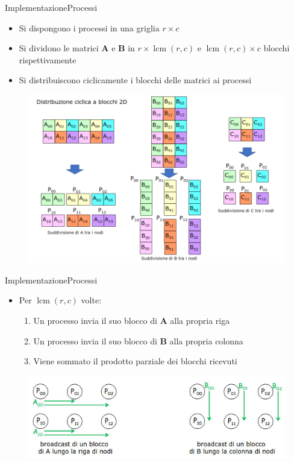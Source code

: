 \documentclass{beamer}
\DeclareMathOperator{\lcm}{lcm}
\begin{document}
\begin{frame}{Implementazione}{Processi}
    \begin{itemize}
        \item Si dispongono i processi in una griglia $r \times c$
        \item Si dividono le matrici $\mathbf{A}$ e $\mathbf{B}$ in $r \times \lcm(r,c)$ e $\lcm(r,c) \times c$ blocchi rispettivamente
        \item Si distribuiscono ciclicamente i blocchi delle matrici ai processi
    \end{itemize}
    \begin{figure}
        \includegraphics[width=0.55\linewidth]{imgs/summa.png}
    \end{figure}
\end{frame}

\begin{frame}{Implementazione}{Processi}
    \begin{itemize}
        \item Per $\lcm(r,c)$ volte:
              \begin{enumerate}
                  \item Un processo invia il suo blocco di $\mathbf{A}$ alla propria riga
                  \item Un processo invia il suo blocco di $\mathbf{B}$ alla propria colonna
                  \item Viene sommato il prodotto parziale dei blocchi ricevuti
              \end{enumerate}
    \end{itemize}
    \begin{figure}
        \includegraphics[width=0.75\linewidth]{imgs/broadcast_1.jpg}
    \end{figure}
\end{frame}
\end{document}
